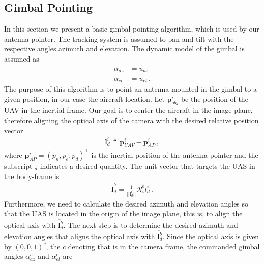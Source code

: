 \subsection{Gimbal Pointing}{\label{sub:gimbal_pointing}}
In this section we present a basic gimbal-pointing algorithm, which is used by our antenna pointer. The tracking system is assumed to pan and tilt with the respective angles azimuth and elevation. The dynamic model of the gimbal is assumed as
\begin{align*}
\dot{\alpha}_{az}&=u_{az} \\
\dot{\alpha}_{el}&=u_{el}\,.
\end{align*}
The purpose of this algorithm is to point an antenna mounted in the gimbal to a given position, in our case the aircraft location. Let $\boldsymbol{p}_{obj}^i$ be the position of the UAV in the inertial frame. Our goal is to center the aircraft in the image plane, therefore aligning the optical axis of the camera with the desired relative position vector
\begin{align*}
\boldsymbol{l}_{d}^i\triangleq \boldsymbol{p}_{UAV}^i-\boldsymbol{p}_{AP}^i\,,
\end{align*}
where $\boldsymbol{p}_{AP}^i = (p_n,p_e,p_d)^\top$ is the inertial position of the antenna pointer and the subscript $_d$ indicates a desired quantity. The unit vector that targets the UAS in the body-frame is
\begin{align*}
\check{\boldsymbol{l}}_d^b=\frac{1}{\lvert\lvert \boldsymbol{l}_d^i\rvert\rvert}\mathcal{R}_i^bl_d^i\,.
\end{align*}
Furthermore, we need to calculate the desired azimuth and elevation angles so that the UAS is located in the origin of the image plane, this is, to align the optical axis with $\check{\boldsymbol{l}_d^b}$.
The next step is to determine the desired azimuth and elevation angles that aligns the optical axis with $\check{\boldsymbol{l}_d^b}$. Since the optical axis is given by $(0,0,1)^c$, the $c$ denoting that is in the camera frame, the commanded gimbal angles $\alpha_{az}^c$ and $\alpha_{el}^c$ are

